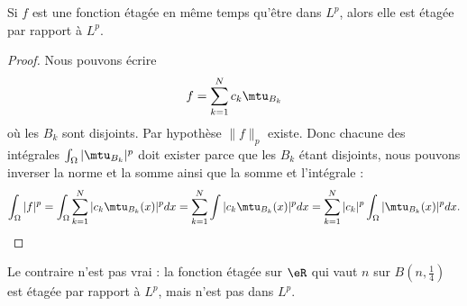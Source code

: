 \begin{lemma}   \label{LemWHIRdaX}
	Si \( f\) est une fonction étagée en même temps qu'être dans \( L^p\), alors elle est étagée par rapport à \( L^p\).
\end{lemma}

\begin{proof}
	Nous pouvons écrire
	\begin{equation}
		f=\sum_{k=1}^Nc_k\mtu_{B_k}
	\end{equation}
	où les \( B_k\) sont disjoints. Par hypothèse \( \| f \|_p\) existe. Donc chacune des intégrales \( \int_{\Omega}| \mtu_{B_k} |^p\) doit exister parce que les \( B_k\) étant disjoints, nous pouvons inverser la norme et la somme ainsi que la somme et l'intégrale :
	\begin{equation}
		\int_{\Omega}|f|^p=\int_{\Omega}\sum_{k=1}^N| c_k\mtu_{B_k}(x) |^pdx=\sum_{k=1}^N\int| c_k\mtu_{B_k}(x) |^pdx=\sum_{k=1}^N| c_k |^p\int_{\Omega}| \mtu_{B_k}(x) |^pdx.
	\end{equation}
\end{proof}
Le contraire n'est pas vrai : la fonction étagée sur \( \eR\) qui vaut \( n\) sur \( B(n,\frac{1}{ 4 })\) est étagée par rapport à \( L^p\), mais n'est pas dans \( L^p\).

